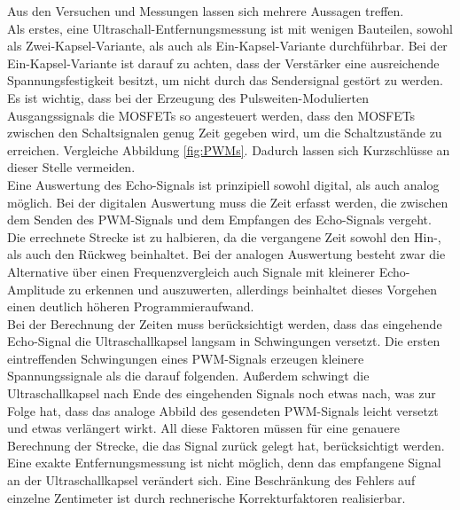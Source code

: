 Aus den Versuchen und Messungen lassen sich mehrere Aussagen treffen. \\
Als erstes, eine Ultraschall-Entfernungsmessung ist mit wenigen Bauteilen, sowohl als Zwei-Kapsel-Variante, als auch als Ein-Kapsel-Variante durchführbar. Bei der Ein-Kapsel-Variante ist darauf zu achten, dass der Verstärker eine ausreichende Spannungsfestigkeit besitzt, um nicht durch das Sendersignal gestört zu werden. Es ist wichtig, dass bei der Erzeugung des Pulsweiten-Modulierten Ausgangssignals die MOSFETs so angesteuert werden, dass den MOSFETs zwischen den Schaltsignalen genug Zeit gegeben wird, um die Schaltzustände zu erreichen. Vergleiche Abbildung \ref{fig:PWMs}. Dadurch lassen sich Kurzschlüsse an dieser Stelle vermeiden.\\
Eine Auswertung des Echo-Signals ist prinzipiell sowohl digital, als auch analog möglich. Bei der digitalen Auswertung muss die Zeit erfasst werden, die zwischen dem Senden des PWM-Signals und dem Empfangen des Echo-Signals vergeht. Die errechnete Strecke ist zu halbieren, da die vergangene Zeit sowohl den Hin-, als auch den Rückweg beinhaltet. Bei der analogen Auswertung besteht zwar die Alternative über einen Frequenzvergleich auch Signale mit kleinerer Echo-Amplitude zu erkennen und auszuwerten, allerdings beinhaltet dieses Vorgehen einen deutlich höheren Programmieraufwand.\\
Bei der Berechnung der Zeiten muss berücksichtigt werden, dass das eingehende Echo-Signal die Ultraschallkapsel langsam in Schwingungen versetzt. Die ersten eintreffenden Schwingungen eines PWM-Signals erzeugen kleinere Spannungssignale als die darauf folgenden. Außerdem schwingt die Ultraschallkapsel nach Ende des eingehenden Signals noch etwas nach, was zur Folge hat, dass das analoge Abbild des gesendeten PWM-Signals leicht versetzt und etwas verlängert wirkt. All diese Faktoren müssen für eine genauere Berechnung der Strecke, die das Signal zurück gelegt hat, berücksichtigt werden. Eine exakte Entfernungsmessung ist nicht möglich, denn das empfangene Signal an der Ultraschallkapsel verändert sich. Eine Beschränkung des Fehlers auf einzelne Zentimeter ist durch rechnerische Korrekturfaktoren realisierbar.\\
